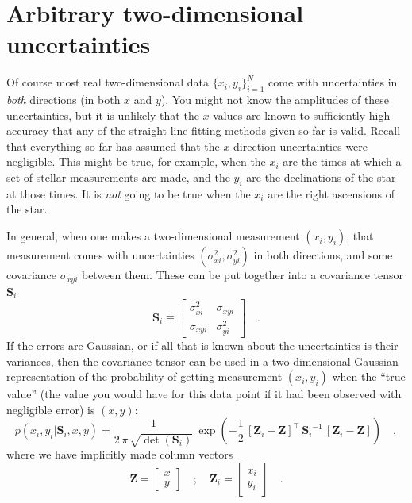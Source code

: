 \documentclass[12pt,twoside]{article}
\newcommand{\mmatrix}[1]{\boldsymbol{#1}}
\newcommand{\inverse}[1]{{#1}^{-1}}
\newcommand{\transpose}[1]{{#1}^{\scriptscriptstyle \top}}
\newcommand{\mS}{\mmatrix{S}}
\newcommand{\mZ}{\mmatrix{Z}}
\newcommand{\setofall}[3]{\{{#1}\}_{{#2}}^{{#3}}}
\newcommand{\allxy}{\setofall{x_i,y_i}{i=1}{N}}
\begin{document}
\section{Arbitrary two-dimensional uncertainties}\label{sec:twod}

Of course most real two-dimensional data $\allxy$ come with
uncertainties in \emph{both} directions (in both $x$ and $y$).  You
might not know the amplitudes of these uncertainties, but it is
unlikely that the $x$ values are known to sufficiently high accuracy
that any of the straight-line fitting methods given so far is valid.
Recall that everything so far has assumed that the $x$-direction
uncertainties were negligible.  This might be true, for example, when
the $x_i$ are the times at which a set of stellar measurements are
made, and the $y_i$ are the declinations of the star at those times.
It is \emph{not} going to be true when the $x_i$ are the right
ascensions of the star.

In general, when one makes a two-dimensional measurement $(x_i,y_i)$,
that measurement comes with uncertainties $(\sigma_{xi}^2,\sigma_{yi}^2)$
in both directions, and some covariance $\sigma_{xyi}$ between them.
These can be put together into a covariance tensor $\mS_i$
\begin{equation}
\mS_i \equiv \left[\begin{array}{cc}
\sigma_{xi}^2 & \sigma_{xyi} \\ \sigma_{xyi} & \sigma_{yi}^2
\end{array}\right] \quad .
\end{equation}
If the errors are Gaussian, or if all that is known about the
uncertainties is their variances, then the covariance tensor can be
used in a two-dimensional Gaussian representation of the probability
of getting measurement $(x_i,y_i)$ when the ``true value'' (the value
you would have for this data point if it had been observed with
negligible error) is $(x,y)$:
\begin{equation}
p(x_i,y_i|\mS_i,x,y) = \frac{1}{2\,\pi\,\sqrt{\det(\mS_i)}}
  \,\exp\left(-\frac{1}{2}\,\transpose{\left[\mZ_i - \mZ\right]}
  \,\inverse{\mS_i}\,\left[\mZ_i - \mZ\right]\right) \quad ,
\end{equation}
where we have implicitly made column vectors
\begin{equation}\label{eq:mZ}
\mZ = \left[\begin{array}{c} x \\ y \end{array}\right] \quad ; \quad
\mZ_i = \left[\begin{array}{c} x_i \\ y_i \end{array}\right] \quad .
\end{equation}
\end{document}
